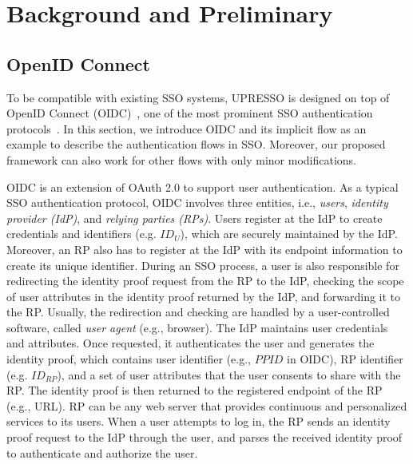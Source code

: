 \section{Background and Preliminary}
\label{sec:background}


\subsection{OpenID Connect}
\label{subsec:OIDC}

To be compatible with existing SSO systems, UPRESSO is designed on top of OpenID Connect (OIDC)~\cite{OpenIDConnect}, one of the most prominent SSO authentication protocols~\cite{SAMLIdentifier}. In this section, we introduce OIDC and its implicit flow as an example to describe the authentication flows in SSO. Moreover, our proposed framework can also work for other flows with only minor modifications.

OIDC is an extension of OAuth 2.0 to support user authentication. As a typical SSO authentication protocol, OIDC involves three entities, i.e., {\em users}, {\em identity provider (IdP)}, and {\em relying parties (RPs)}. Users register at the IdP to create credentials and identifiers (e.g. $ID_U$), which are securely maintained by the IdP. Moreover, an RP also has to register at the IdP with its endpoint information to create its unique identifier. During an SSO process, a user is also responsible for redirecting the identity proof request from the RP to the IdP, checking the scope of user attributes in the identity proof returned by the IdP, and forwarding it to the RP. Usually, the redirection and checking are handled by a user-controlled software, called {\em user agent} (e.g., browser). The IdP maintains user credentials and attributes. Once requested, it authenticates the user and generates the identity proof, which contains user identifier (e.g., $PPID$ in OIDC), RP identifier (e.g. $ID_{RP}$), and a set of user attributes that the user consents to share with the RP. The identity proof is then returned to the registered endpoint of the RP (e.g., URL). RP can be any web server that provides continuous and personalized services to its users. When a user attempts to log in, the RP sends an identity proof request to the IdP through the user, and parses the received identity proof to authenticate and authorize the user.



